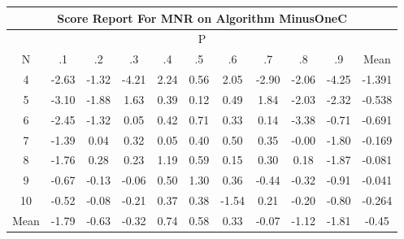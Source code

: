 \documentclass[11pt,a4paper]{report}
\begin{document}
\begin{longtable}{ | c || c | c | c | c | c | c | c | c | c || c |}
\hline
\multicolumn{11}{|c|}{ Score Report For MNR on Algorithm MinusOneC} \\
\hline
\multicolumn{11}{|c|}{ P } \\
\hline
N & .1 & .2 & .3 & .4 & .5 & .6 & .7 & .8 & .9 & Mean\\
 \hline
 \hline
 \endhead
  4 &  \cellcolor[HTML]{FFBFBF} -2.63 &  \cellcolor[HTML]{FFDFDF} -1.32 &  \cellcolor[HTML]{FF9797} -4.21 &  \cellcolor[HTML]{C7C7FF} 2.24 &  \cellcolor[HTML]{EFEFFF} 0.56 &  \cellcolor[HTML]{CFCFFF} 2.05 &  \cellcolor[HTML]{FFB7B7} -2.90 &  \cellcolor[HTML]{FFCFCF} -2.06 &  \cellcolor[HTML]{FF9797} -4.25 & -1.391 \\
  5 &  \cellcolor[HTML]{FFAFAF} -3.10 &  \cellcolor[HTML]{FFCFCF} -1.88 &  \cellcolor[HTML]{D7D7FF} 1.63 &  \cellcolor[HTML]{F7F7FF} 0.39 &  \cellcolor[HTML]{FFFFFF} 0.12 &  \cellcolor[HTML]{EFEFFF} 0.49 &  \cellcolor[HTML]{CFCFFF} 1.84 &  \cellcolor[HTML]{FFCFCF} -2.03 &  \cellcolor[HTML]{FFC7C7} -2.32 & -0.538 \\
  6 &  \cellcolor[HTML]{FFBFBF} -2.45 &  \cellcolor[HTML]{FFDFDF} -1.32 &  \cellcolor[HTML]{FFFFFF} 0.05 &  \cellcolor[HTML]{F7F7FF} 0.42 &  \cellcolor[HTML]{EFEFFF} 0.71 &  \cellcolor[HTML]{F7F7FF} 0.33 &  \cellcolor[HTML]{FFFFFF} 0.14 &  \cellcolor[HTML]{FFA7A7} -3.38 &  \cellcolor[HTML]{FFEFEF} -0.71 & -0.691 \\
  7 &  \cellcolor[HTML]{FFDFDF} -1.39 &  \cellcolor[HTML]{FFFFFF} 0.04 &  \cellcolor[HTML]{F7F7FF} 0.32 &  \cellcolor[HTML]{FFFFFF} 0.05 &  \cellcolor[HTML]{F7F7FF} 0.40 &  \cellcolor[HTML]{EFEFFF} 0.50 &  \cellcolor[HTML]{F7F7FF} 0.35 &  \cellcolor[HTML]{FFFFFF} -0.00 &  \cellcolor[HTML]{FFCFCF} -1.80 & -0.169 \\
  8 &  \cellcolor[HTML]{FFCFCF} -1.76 &  \cellcolor[HTML]{F7F7FF} 0.28 &  \cellcolor[HTML]{F7F7FF} 0.23 &  \cellcolor[HTML]{DFDFFF} 1.19 &  \cellcolor[HTML]{EFEFFF} 0.59 &  \cellcolor[HTML]{FFFFFF} 0.15 &  \cellcolor[HTML]{F7F7FF} 0.30 &  \cellcolor[HTML]{F7F7FF} 0.18 &  \cellcolor[HTML]{FFCFCF} -1.87 & -0.081 \\
  9 &  \cellcolor[HTML]{FFEFEF} -0.67 &  \cellcolor[HTML]{FFFFFF} -0.13 &  \cellcolor[HTML]{FFFFFF} -0.06 &  \cellcolor[HTML]{EFEFFF} 0.50 &  \cellcolor[HTML]{DFDFFF} 1.30 &  \cellcolor[HTML]{F7F7FF} 0.36 &  \cellcolor[HTML]{FFF7F7} -0.44 &  \cellcolor[HTML]{FFF7F7} -0.32 &  \cellcolor[HTML]{FFE7E7} -0.91 & -0.041 \\
  10 &  \cellcolor[HTML]{FFEFEF} -0.52 &  \cellcolor[HTML]{FFFFFF} -0.08 &  \cellcolor[HTML]{FFF7F7} -0.21 &  \cellcolor[HTML]{F7F7FF} 0.37 &  \cellcolor[HTML]{F7F7FF} 0.38 &  \cellcolor[HTML]{FFD7D7} -1.54 &  \cellcolor[HTML]{F7F7FF} 0.21 &  \cellcolor[HTML]{FFF7F7} -0.20 &  \cellcolor[HTML]{FFE7E7} -0.80 & -0.264 \\
 \hline
 \hline
Mean &  \cellcolor[HTML]{FFCFCF} -1.79 &  \cellcolor[HTML]{FFEFEF} -0.63 &  \cellcolor[HTML]{FFF7F7} -0.32 &  \cellcolor[HTML]{EFEFFF} 0.74 &  \cellcolor[HTML]{EFEFFF} 0.58 &  \cellcolor[HTML]{F7F7FF} 0.33 &  \cellcolor[HTML]{FFFFFF} -0.07 &  \cellcolor[HTML]{FFDFDF} -1.12 &  \cellcolor[HTML]{FFCFCF} -1.81 &  \cellcolor[HTML]{FFF7F7} -0.45
\end{longtable}
\end{document}
